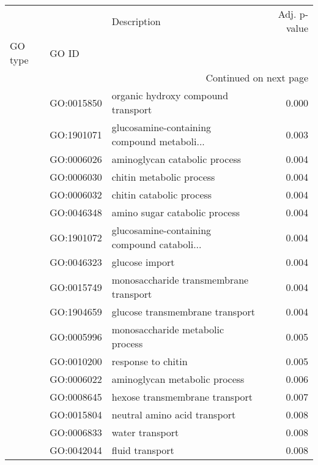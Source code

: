 \begin{longtable}{lllr}
\toprule
   &            &                                  Description &  Adj. p-value \\
GO type & GO ID &                                              &               \\
\midrule
\endhead
\midrule
\multicolumn{4}{r}{{Continued on next page}} \\
\midrule
\endfoot

\bottomrule
\endlastfoot
\multirow{56}{*}{BP} & GO:0015850 &           organic hydroxy compound transport &         0.000 \\
   & GO:1901071 &  glucosamine-containing compound metaboli... &         0.003 \\
   & GO:0006026 &                aminoglycan catabolic process &         0.004 \\
   & GO:0006030 &                     chitin metabolic process &         0.004 \\
   & GO:0006032 &                     chitin catabolic process &         0.004 \\
   & GO:0046348 &                amino sugar catabolic process &         0.004 \\
   & GO:1901072 &  glucosamine-containing compound cataboli... &         0.004 \\
   & GO:0046323 &                               glucose import &         0.004 \\
   & GO:0015749 &       monosaccharide transmembrane transport &         0.004 \\
   & GO:1904659 &              glucose transmembrane transport &         0.004 \\
   & GO:0005996 &             monosaccharide metabolic process &         0.005 \\
   & GO:0010200 &                           response to chitin &         0.005 \\
   & GO:0006022 &                aminoglycan metabolic process &         0.006 \\
   & GO:0008645 &               hexose transmembrane transport &         0.007 \\
   & GO:0015804 &                 neutral amino acid transport &         0.008 \\
   & GO:0006833 &                              water transport &         0.008 \\
   & GO:0042044 &                              fluid transport &         0.008 \\

\end{longtable}
